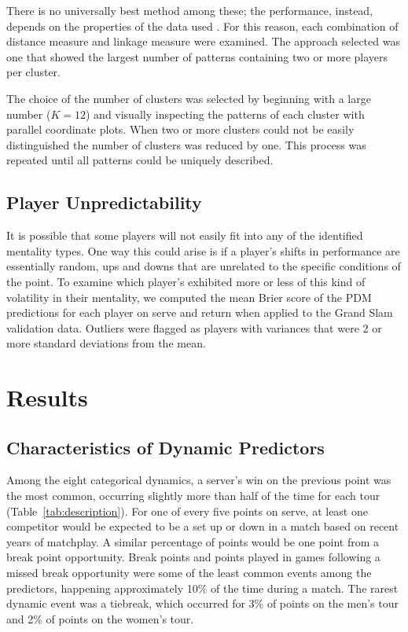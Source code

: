 \documentclass{Latex/svjour3}
\begin{document}
There is no universally best method among these; the performance,
instead, depends on the properties of the data used
\cite{kumar2014performance}. For this reason, each
combination of distance measure and linkage measure were examined. The
approach selected was one that showed the largest number of patterns
containing two or more players per cluster. 

The choice of the number of clusters was selected by beginning with a
large number ($K = 12$) and visually inspecting the patterns of each
cluster with parallel coordinate plots. When two or more clusters
could not be easily distinguished the number of clusters was reduced
by one. This process was repeated until all patterns could be
uniquely described. 



\subsection{Player Unpredictability}

It is possible that some players will not easily fit into any of the
identified mentality types. One way this could arise is if a player's
shifts in performance are essentially random, ups and downs that are
unrelated to the specific conditions of the point. To examine which
player's exhibited more or less of this kind of volatility in their
mentality, we computed the mean Brier score of the PDM predictions for each player on serve and
return when applied to the Grand Slam validation data. Outliers were flagged
as players with variances that were 2 or more standard deviations from
the mean. 

\section{Results}

\subsection{Characteristics of Dynamic Predictors}

Among the eight categorical dynamics, a
server's win on the previous point was the most common, occurring
slightly more than half of the time for each tour
(Table~\ref{tab:description}). For one of every five points on serve,
at least one competitor would be expected to be a set up or down in a
match based on recent years of matchplay. A
similar percentage of points would be one point from a break point
opportunity. Break points and points played in games following a
missed break opportunity were some of the least common events among
the predictors, happening approximately 10\% of the time during a
match. The rarest dynamic event was a tiebreak, which occurred
for 3\% of points on the men's tour and 2\% of points on the women's
tour. 
\end{document}
